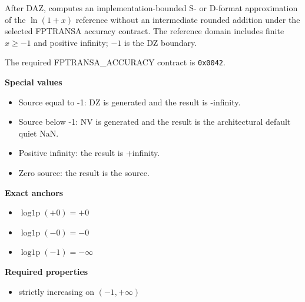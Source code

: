 After DAZ, computes an implementation-bounded S- or D-format approximation of the $\ln(1 + x)$ reference without an intermediate rounded addition under the selected FPTRANSA accuracy contract. The reference domain includes finite $x \ge -1$ and positive infinity; $-1$ is the DZ boundary.

The required FPTRANSA\_ACCURACY contract is \texttt{0x0042}.

\textbf{Special values}\par
\begin{itemize}
\item Source equal to -1: DZ is generated and the result is -infinity.
\item Source below -1: NV is generated and the result is the architectural default quiet NaN.
\item Positive infinity: the result is +infinity.
\item Zero source: the result is the source.
\end{itemize}

\textbf{Exact anchors}\par
\begin{itemize}
\item $\operatorname{log1p}(+0) = +0$
\item $\operatorname{log1p}(-0) = -0$
\item $\operatorname{log1p}(-1) = -\infty$
\end{itemize}

\textbf{Required properties}\par
\begin{itemize}
\item strictly increasing on $(-1, +\infty)$
\end{itemize}
